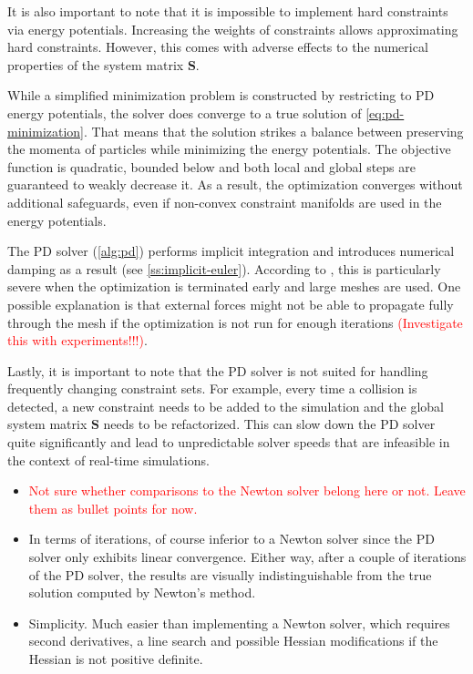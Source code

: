 It is also important to note that it is impossible to implement hard constraints via energy potentials. Increasing
the weights of constraints allows approximating hard constraints. However, this comes with adverse effects to the numerical properties of the 
system matrix $\bm{S}$.

While a simplified minimization problem is constructed by restricting to PD energy potentials, the solver does converge to a 
true solution of \cref{eq:pd-minimization}. That means that the solution strikes a balance between preserving 
the momenta of particles while minimizing the energy potentials. The objective function is quadratic, bounded below and both local and 
global steps are guaranteed to weakly decrease it. As a result, the optimization converges without additional safeguards, even if 
non-convex constraint manifolds are used in the energy potentials.

The PD solver (\cref{alg:pd}) performs implicit integration and introduces numerical damping as a result (see \cref{ss:implicit-euler}).
According to \cite{bouaziz2014}, this is particularly severe when the optimization is terminated early and large meshes are used. One possible
explanation is that external forces might not be able to propagate fully through the mesh if the optimization is not run for enough iterations
\cite{bouaziz2014} \textcolor{red}{(Investigate this with experiments!!!)}.

Lastly, it is important to note that the PD solver is not suited for handling frequently changing constraint sets. For example, every time 
a collision is detected, a new constraint needs to be added to the simulation and the global system matrix $\bm{S}$ needs
to be refactorized. This can slow down the PD solver quite significantly and lead to unpredictable solver speeds that are infeasible in the
context of real-time simulations.

\begin{itemize}
    \item \textcolor{red}{Not sure whether comparisons to the Newton solver belong here or not. Leave them as bullet points for now.}
    \item In terms of iterations, of course inferior to a Newton solver since the PD solver only exhibits linear convergence. 
        Either way, after a couple of iterations of the PD solver, the results are visually 
        indistinguishable from the true solution computed by Newton's method.
    \item Simplicity. Much easier than implementing a Newton solver, which requires second derivatives, a line search and possible 
        Hessian modifications if the Hessian is not positive definite. 
\end{itemize}

